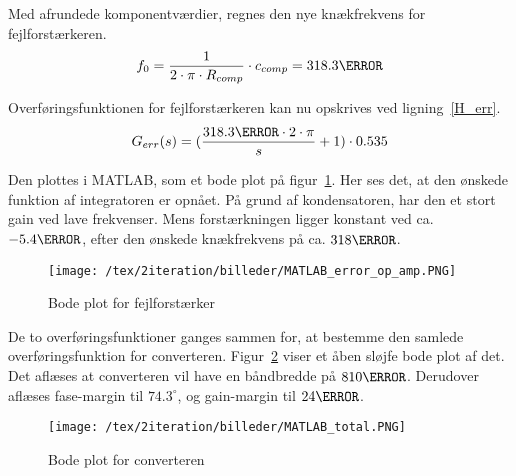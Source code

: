 \noindent Med afrundede komponentværdier, regnes den nye knækfrekvens for fejlforstærkeren.
\begin{equation} \label{f_0}
f_0 = \frac{1}{2\cdot \pi \cdot R_{comp}} \cdot c_{comp} = 318.3\hertz
\end{equation}

\noindent Overføringsfunktionen for fejlforstærkeren kan nu opskrives ved ligning~\ref{H_err}.
\begin{equation} \label{H_err}
G_{err}(s) = (\frac{318.3\hertz \cdot 2\cdot\pi}{s} + 1) \cdot 0.535
\end{equation}

\noindent Den plottes i MATLAB, som et bode plot på figur~\ref{fig:MATLAB_error_op_amp_2}. Her ses det, at den ønskede funktion af integratoren er opnået. På grund af kondensatoren, har den et stort gain ved lave frekvenser. Mens forstærkningen ligger konstant ved ca. $-5.4\decibel$, efter den ønskede knækfrekvens på ca. $318\hertz$.

\begin{figure}[H]
	\center
	\texttt{[image: /tex/2iteration/billeder/MATLAB\_error\_op\_amp.PNG]}
	\caption{Bode plot for fejlforstærker}
	\label{fig:MATLAB_error_op_amp_2}
\end{figure}

De to overføringsfunktioner ganges sammen for, at bestemme den samlede overføringsfunktion for converteren. Figur~\ref{fig:MATLAB_total_2} viser et åben sløjfe bode plot af det. Det aflæses at converteren vil have en båndbredde på $810\hertz$. Derudover aflæses fase-margin til $74.3^\circ$, og gain-margin til $24\decibel$.

\begin{figure}[H]
	\center
	\texttt{[image: /tex/2iteration/billeder/MATLAB\_total.PNG]}
	\caption{Bode plot for converteren}
	\label{fig:MATLAB_total_2}
\end{figure} 


